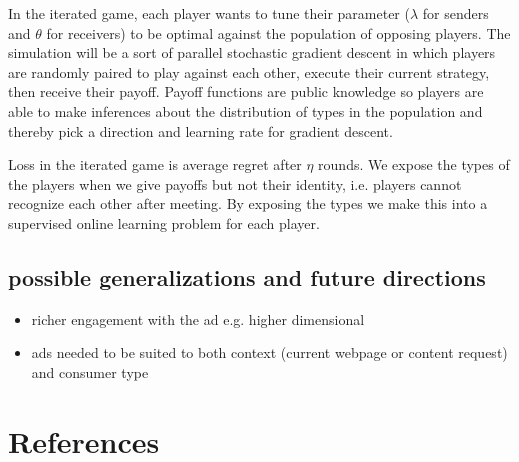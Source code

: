 \documentclass{article}
\begin{document}
In the iterated game, each player wants to tune their parameter ($\lambda$ for senders and $\theta$ for receivers) to be optimal against the population of opposing players. The simulation will be a sort of parallel stochastic gradient descent in which players are randomly paired to play against each other, execute their current strategy, then receive their payoff. Payoff functions are public knowledge so players are able to make inferences about the distribution of types in the population and thereby pick a direction and learning rate for gradient descent.

Loss in the iterated game is average regret after $\eta$ rounds. We expose the types of the players when we give payoffs but not their identity, i.e. players cannot recognize each other after meeting. By exposing the types we make this into a supervised online learning problem for each player.

\subsection{possible generalizations and future directions}

\begin{itemize}
	\item richer engagement with the ad e.g. higher dimensional
	\item ads needed to be suited to both context (current webpage or content request) and consumer type
\end{itemize}

\section{References}



\end{document}
